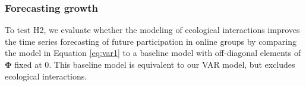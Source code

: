 \documentclass[letterpaper]{article}\usepackage[]{graphicx}\usepackage[]{color}
\begin{document}






\subsubsection{Forecasting growth}
\label{sec:mes.forecasting}
To test H2, we evaluate whether the modeling of ecological interactions improves the time series forecasting of future participation in online groups by comparing the model in Equation \ref{eq:var1} to a baseline model with off-diagonal elements of $\mathbf{\Phi}$ fixed at 0. This baseline model is equivalent to our VAR model, but excludes ecological interactions.
\end{document}
